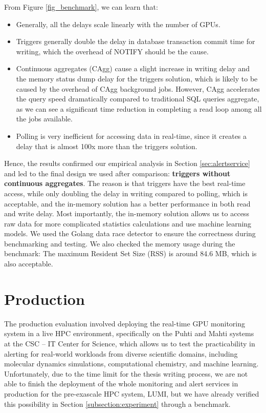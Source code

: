 From Figure \ref{fig_benchmark}, we can learn that:

\begin{itemize}
    \item Generally, all the delays scale linearly with the number of GPUs.
    \item Triggers generally double the delay in database transaction commit time for writing, which the overhead of NOTIFY should be the cause.
    \item Continuous aggregates (CAgg) cause a slight increase in writing delay and the memory status dump delay for the triggers solution, which is likely to be caused by the overhead of CAgg background jobs. However, CAgg accelerates the query speed dramatically compared to traditional SQL queries aggregate, as we can see a significant time reduction in completing a read loop among all the jobs available.
    \item Polling is very inefficient for accessing data in real-time, since it creates a delay that is almost 100x more than the triggers solution.
\end{itemize}

Hence, the results confirmed our empirical analysis in Section \ref{sec:alertservice} and led to the final design we used after comparison: \textbf{triggers without continuous aggregates}. The reason is that triggers have the best real-time access, while only doubling the delay in writing compared to polling, which is acceptable, and the in-memory solution has a better performance in both read and write delay. Most importantly, the in-memory solution allows us to access raw data for more complicated statistics calculations and use machine learning models. We used the Golang data race detector to ensure the correctness during benchmarking and testing. We also checked the memory usage during the benchmark: The maximum Resident Set Size (RSS) is around 84.6 MB, which is also acceptable.


\section{Production}

The production evaluation involved deploying the real-time GPU monitoring system in a live HPC environment, specifically on the Puhti and Mahti systems at the CSC -- IT Center for Science, which allows us to test the practicability in alerting for real-world workloads from diverse scientific domains, including molecular dynamics simulations, computational chemistry, and machine learning. Unfortunately, due to the time limit for the thesis writing process, we are not able to finish the deployment of the whole monitoring and alert services in production for the pre-exascale HPC system, LUMI, but we have already verified this possibility in Section \ref{subsection:experiment} through a benchmark.

